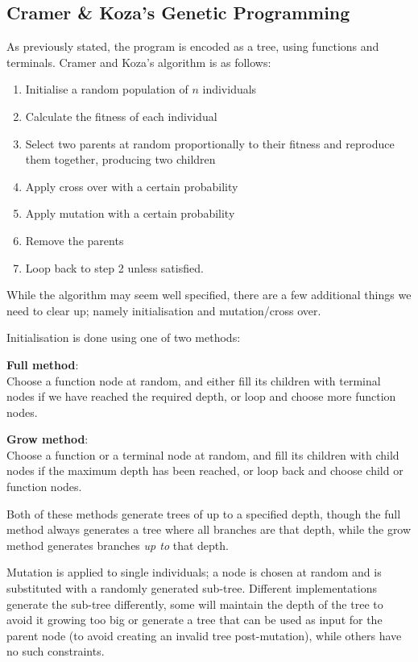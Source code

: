 \subsection{Cramer \& Koza's Genetic Programming}

As previously stated, the program is encoded as a tree, using
functions and terminals. Cramer and Koza's algorithm is as follows:

\begin{enumerate}
\item Initialise a random population of $n$ individuals
\item Calculate the fitness of each individual
\item Select two parents at random proportionally to their fitness and
reproduce them together, producing two children
\item Apply cross over with a certain probability
\item Apply mutation with a certain probability
\item Remove the parents
\item Loop back to step 2 unless satisfied.
\end{enumerate}

While the algorithm may seem well specified, there are a few
additional things we need to clear up; namely initialisation and
mutation/cross over.

Initialisation is done using one of two methods:

\begin{description}
\item \textbf{Full method}:\\ Choose a function node at random, and
either fill its children with terminal nodes if we have reached the
required depth, or loop and choose more function nodes.
\item \textbf{Grow method}:\\ Choose a function or a terminal node at
random, and fill its children with child nodes if the maximum depth
has been reached, or loop back and choose child or function nodes.
\end{description}

Both of these methods generate trees of up to a specified depth,
though the full method always generates a tree where all branches are
that depth, while the grow method generates branches \textit{up to}
that depth.

Mutation is applied to single individuals; a node is chosen at random
and is substituted with a randomly generated sub-tree. Different
implementations generate the sub-tree differently, some will maintain
the depth of the tree to avoid it growing too big or generate a tree
that can be used as input for the parent node (to avoid creating an
invalid tree post-mutation), while others have no such constraints.

